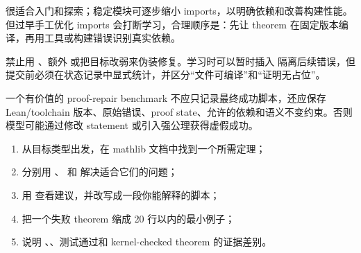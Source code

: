  很适合入门和探索；稳定模块可逐步缩小 imports，以明确依赖和改善构建性能。但过早手工优化 imports 会打断学习，合理顺序是：先让 theorem 在固定版本编译，再用工具或构建错误识别真实依赖。

\begin{warningbox}
禁止用 、额外  或把目标改弱来伪装修复。学习时可以暂时插入  隔离后续错误，但提交前必须在状态记录中显式统计，并区分“文件可编译”和“证明无占位”。
\end{warningbox}

\begin{aibox}
一个有价值的 proof-repair benchmark 不应只记录最终成功脚本，还应保存 Lean/toolchain 版本、原始错误、proof state、允许的依赖和语义不变约束。否则模型可能通过修改 statement 或引入强公理获得虚假成功。
\end{aibox}

\begin{checkpointbox}
\begin{enumerate}
  \item 从目标类型出发，在 mathlib 文档中找到一个所需定理；
  \item 分别用 、 和  解决适合它们的问题；
  \item 用  查看建议，并改写成一段你能解释的脚本；
  \item 把一个失败 theorem 缩成 20 行以内的最小例子；
  \item 说明 、、测试通过和 kernel-checked theorem 的证据差别。
\end{enumerate}
\end{checkpointbox}
